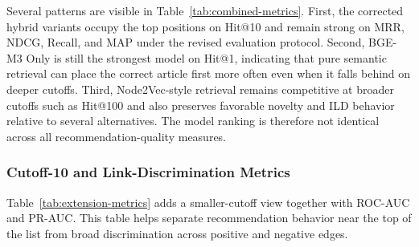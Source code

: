\documentclass[runningheads]{llncs}
\begin{document}
Several patterns are visible in Table~\ref{tab:combined-metrics}. First, the
corrected hybrid variants occupy the top positions on Hit@10 and remain strong
on MRR, NDCG, Recall, and MAP under the revised evaluation protocol. Second,
BGE-M3 Only is still the strongest model on Hit@1, indicating that pure
semantic retrieval can place the correct article first more often even when it
falls behind on deeper cutoffs. Third, Node2Vec-style retrieval remains
competitive at broader cutoffs such as Hit@100 and also preserves favorable
novelty and ILD behavior relative to several alternatives. The model ranking is
therefore not identical across all recommendation-quality measures.

\subsubsection{Cutoff-10 and Link-Discrimination Metrics}

Table~\ref{tab:extension-metrics} adds a smaller-cutoff view together with
ROC-AUC and PR-AUC. This table helps separate recommendation behavior near the
top of the list from broad discrimination across positive and negative edges.

\begin{table}[H]
\caption{Cutoff-10 ranking metrics and link-discrimination metrics on the revised protocol}
\label{tab:extension-metrics}
\centering
\setlength{\tabcolsep}{4pt}
\renewcommand{\arraystretch}{1.10}
\end{table}
\end{document}
